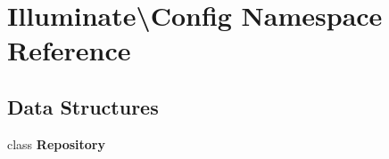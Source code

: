 \section{Illuminate\textbackslash{}Config Namespace Reference}
\label{namespace_illuminate_1_1_config}
\subsection*{Data Structures}
\begin{DoxyCompactItemize}
\item 
class {\bf Repository}
\end{DoxyCompactItemize}
